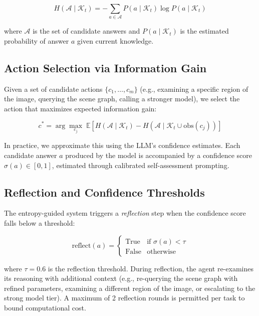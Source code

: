 \documentclass[11pt]{article}
\begin{document}
\begin{equation}
  H(\mathcal{A} \mid \mathcal{K}_t) = -\sum_{a \in \mathcal{A}} P(a \mid \mathcal{K}_t) \log P(a \mid \mathcal{K}_t)
  \label{eq:entropy}
\end{equation}

where $\mathcal{A}$ is the set of candidate answers and $P(a \mid \mathcal{K}_t)$ is the estimated probability of answer $a$ given current knowledge.

\subsection{Action Selection via Information Gain}

Given a set of candidate actions $\{c_1, \ldots, c_m\}$ (e.g., examining a specific region of the image, querying the scene graph, calling a stronger model), we select the action that maximizes expected information gain:

\begin{equation}
  c^* = \arg\max_{c_j} \; \mathbb{E}\left[ H(\mathcal{A} \mid \mathcal{K}_t) - H(\mathcal{A} \mid \mathcal{K}_t \cup \text{obs}(c_j)) \right]
  \label{eq:ig}
\end{equation}

In practice, we approximate this using the LLM's confidence estimates. Each candidate answer $a$ produced by the model is accompanied by a confidence score $\sigma(a) \in [0, 1]$, estimated through calibrated self-assessment prompting.

\subsection{Reflection and Confidence Thresholds}

The entropy-guided system triggers a \emph{reflection} step when the confidence score falls below a threshold:

\begin{equation}
  \text{reflect}(a) = \begin{cases}
    \text{True}  & \text{if } \sigma(a) < \tau \\
    \text{False} & \text{otherwise}
  \end{cases}
  \label{eq:reflect}
\end{equation}

where $\tau = 0.6$ is the reflection threshold. During reflection, the agent re-examines its reasoning with additional context (e.g., re-querying the scene graph with refined parameters, examining a different region of the image, or escalating to the strong model tier). A maximum of 2 reflection rounds is permitted per task to bound computational cost.
\end{document}
